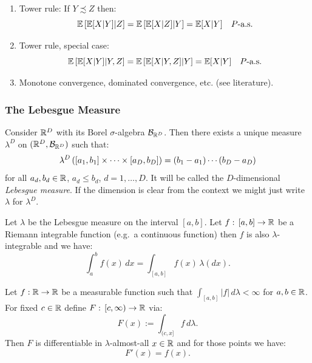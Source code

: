 \begin{Thm}
\begin{enumerate}
        \item Tower rule: If $Y \precsim Z$ then:
            \[ \mathbb{E}\left [\mathbb{E}[X|Y]|Z\right ] = \mathbb{E}\left [\mathbb{E}[X|Z]|Y\right ] = \mathbb{E}[X|Y]\quad P\text{-a.s.}    \]
        \item Tower rule, special case:
            \[ \mathbb{E}\left [\mathbb{E}[X|Y]|Y,Z\right ] = \mathbb{E}\left [\mathbb{E}[X|Y,Z]|Y\right ] = \mathbb{E}[X|Y]\quad P\text{-a.s.}    \]
        \item Monotone convergence, dominated convergence, etc. (see literature).
    \end{enumerate}
\end{Thm}


\subsubsection{The Lebesgue Measure}


\begin{Thm}
    \label{thm-lebesgue-measure}
    Consider $\mathbb{R}^D$ with its Borel $\sigma$-algebra $\mathcal{B}_{\mathbb{R}^D}$.
    Then there exists a unique measure $\lambda^D$ on $(\mathbb{R}^D,\mathcal{B}_{\mathbb{R}^D})$ such that:
    \[ \lambda^D\left ( [a_1,b_1] \times \cdots \times [a_D, b_D]\right ) = (b_1-a_1) \cdots (b_D-a_D)   \]
    for all $a_d, b_d \in \mathbb{R}$, $a_d \le b_d$, $d=1,\dots,D$. 
    It will be called the $D$-dimensional \emph{Lebesgue measure}.
    If the dimension is clear from the context we might just write $\lambda$ for $\lambda^D$.
\end{Thm}

\begin{Thm} Let $\lambda$ be the Lebesgue measure on the interval $[a,b]$.  Let $f:\, [a,b] \to \mathbb{R}$ be a Riemann integrable function (e.g.\ a continuous function) then $f$ is also $\lambda$-integrable and we have:
    \[ \int_a^b f(x)\,dx = \int_{[a,b]}  f(x)\, \lambda(dx). \]
\end{Thm}

\begin{Thm}
    Let $f: \mathbb{R} \to \mathbb{R}$ be a measurable function such that $\int_{[a,b]}  |f| \,d\lambda < \infty$ for $a,b \in \mathbb{R}$. %
            For fixed $c \in \mathbb{R}$ define $F:\, [c,\infty) \to \mathbb{R}$ via:
            \[ F(x) := \int_{(c,x]} f\,d\lambda.  \]
            Then $F$ is differentiable in  $\lambda$-almost-all $x \in \mathbb{R}$ and for those points we have:
            \[ F'(x) = f(x).\]
\end{Thm}

